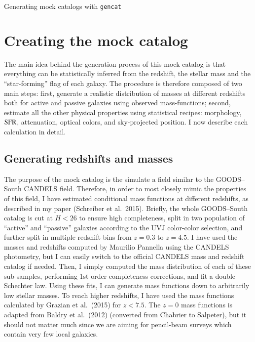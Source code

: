 \documentclass[12pt,a4paper]{article}
\newcommand{\sfr}{{\rm SFR}}
\begin{document}

\begin{center}
{\huge Generating mock catalogs with \texttt{gencat}}
\end{center}

\section{Creating the mock catalog}

The main idea behind the generation process of this mock catalog is that everything can be statistically inferred from the redshift, the stellar mass and the ``star-forming'' flag of each galaxy. The procedure is therefore composed of two main steps: first, generate a realistic distribution of masses at different redshifts both for active and passive galaxies using observed mass-functions; second, estimate all the other physical properties using statistical recipes: morphology, $\sfr$, attenuation, optical colors, and sky-projected position. I now describe each calculation in detail.


\subsection{Generating redshifts and masses}

The purpose of the mock catalog is the simulate a field similar to the GOODS--South CANDELS field. Therefore, in order to most closely mimic the properties of this field, I have estimated conditional mass functions at different redshifts, as described in my paper (Schreiber et al.~2015). Briefly, the whole GOODS--South catalog is cut at $H<26$ to ensure high completeness, split in two population of ``active'' and ``passive'' galaxies according to the UVJ color-color selection, and further split in multiple redshift bins from $z=0.3$ to $z=4.5$. I have used the masses and redshifts computed by Maurilio Pannella using the CANDELS photometry, but I can easily switch to the official CANDELS mass and redshift catalog if needed. Then, I simply computed the mass distribution of each of these sub-samples, performing 1st order completeness corrections, and fit a double Schechter law. Using these fits, I can generate mass functions down to arbitrarily low stellar masses. To reach higher redshifts, I have used the mass functions calculated by Grazian et al.~(2015) for $z < 7.5$. The $z=0$ mass functions is adapted from Baldry et al.~(2012) (converted from Chabrier to Salpeter), but it should not matter much since we are aiming for pencil-beam surveys which contain very few local galaxies.
\end{document}
